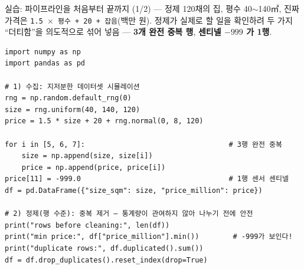\begin{frame}[fragile]{실습: 파이프라인을 처음부터 끝까지 (1/2) --- 정제}
  120채의 집, 평수 40$\sim$140㎡, 진짜 가격은
  \texttt{1.5 $\times$ 평수 + 20 + 잡음}(백만 원). 정제가 실제로 할
  일을 확인하려 두 가지 ``더티함''을 의도적으로 섞어 넣음 ---
  \textbf{3개 완전 중복 행}, \textbf{센티넬 $-999$ 가 1행}.
  \begin{lstlisting}
import numpy as np
import pandas as pd

# 1) 수집: 지저분한 데이터셋 시뮬레이션
rng = np.random.default_rng(0)
size = rng.uniform(40, 140, 120)
price = 1.5 * size + 20 + rng.normal(0, 8, 120)

for i in [5, 6, 7]:                                  # 3행 완전 중복
    size = np.append(size, size[i])
    price = np.append(price, price[i])
price[11] = -999.0                                   # 1행 센서 센티넬
df = pd.DataFrame({"size_sqm": size, "price_million": price})

# 2) 정제(행 수준): 중복 제거 — 통계량이 관여하지 않아 나누기 전에 안전
print("rows before cleaning:", len(df))
print("min price:", df["price_million"].min())        # -999가 보인다!
print("duplicate rows:", df.duplicated().sum())
df = df.drop_duplicates().reset_index(drop=True)
\end{lstlisting}
\end{frame}
